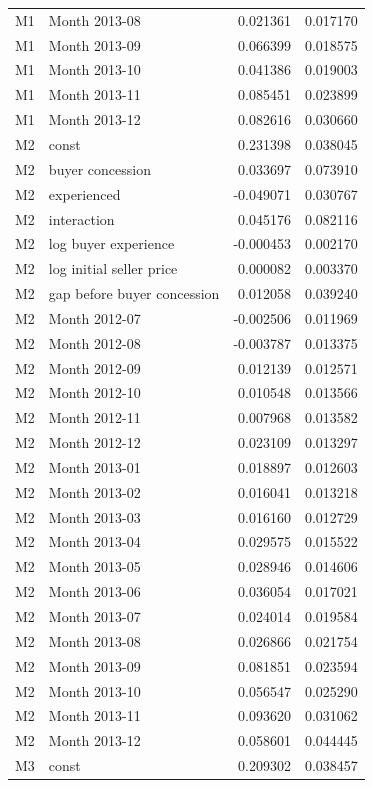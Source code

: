 \documentclass[11pt,a4paper]{article}
\begin{document}
\begin{longtable}{lp{8.4cm}rr}
M1 & Month 2013-08 & 0.021361 & 0.017170 \\
M1 & Month 2013-09 & 0.066399 & 0.018575 \\
M1 & Month 2013-10 & 0.041386 & 0.019003 \\
M1 & Month 2013-11 & 0.085451 & 0.023899 \\
M1 & Month 2013-12 & 0.082616 & 0.030660 \\
M2 & const & 0.231398 & 0.038045 \\
M2 & buyer concession & 0.033697 & 0.073910 \\
M2 & experienced & -0.049071 & 0.030767 \\
M2 & interaction & 0.045176 & 0.082116 \\
M2 & log buyer experience & -0.000453 & 0.002170 \\
M2 & log initial seller price & 0.000082 & 0.003370 \\
M2 & gap before buyer concession & 0.012058 & 0.039240 \\
M2 & Month 2012-07 & -0.002506 & 0.011969 \\
M2 & Month 2012-08 & -0.003787 & 0.013375 \\
M2 & Month 2012-09 & 0.012139 & 0.012571 \\
M2 & Month 2012-10 & 0.010548 & 0.013566 \\
M2 & Month 2012-11 & 0.007968 & 0.013582 \\
M2 & Month 2012-12 & 0.023109 & 0.013297 \\
M2 & Month 2013-01 & 0.018897 & 0.012603 \\
M2 & Month 2013-02 & 0.016041 & 0.013218 \\
M2 & Month 2013-03 & 0.016160 & 0.012729 \\
M2 & Month 2013-04 & 0.029575 & 0.015522 \\
M2 & Month 2013-05 & 0.028946 & 0.014606 \\
M2 & Month 2013-06 & 0.036054 & 0.017021 \\
M2 & Month 2013-07 & 0.024014 & 0.019584 \\
M2 & Month 2013-08 & 0.026866 & 0.021754 \\
M2 & Month 2013-09 & 0.081851 & 0.023594 \\
M2 & Month 2013-10 & 0.056547 & 0.025290 \\
M2 & Month 2013-11 & 0.093620 & 0.031062 \\
M2 & Month 2013-12 & 0.058601 & 0.044445 \\
M3 & const & 0.209302 & 0.038457 \\

\end{longtable}
\end{document}
